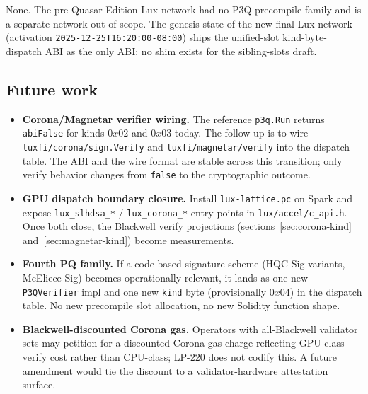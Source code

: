 None. The pre-Quasar Edition Lux network had no P3Q precompile
family and is a separate network out of scope. The genesis state
of the new final Lux network (activation
\texttt{2025-12-25T16:20:00-08:00}) ships the unified-slot
kind-byte-dispatch ABI as the only ABI; no shim exists for the
sibling-slots draft.

\subsection{Future work}

\begin{itemize}[leftmargin=2em,nosep]
\item \textbf{Corona/Magnetar verifier wiring.} The reference
  \texttt{p3q.Run} returns \texttt{abiFalse} for kinds $0x02$
  and $0x03$ today. The follow-up is to wire
  \texttt{luxfi/corona/sign.Verify} and
  \texttt{luxfi/magnetar/verify} into the dispatch table. The
  ABI and the wire format are stable across this transition;
  only verify behavior changes from \texttt{false} to the
  cryptographic outcome.
\item \textbf{GPU dispatch boundary closure.} Install
  \texttt{lux-lattice.pc} on Spark and expose
  \texttt{lux\_slhdsa\_*} / \texttt{lux\_corona\_*} entry
  points in \texttt{lux/accel/c\_api.h}. Once both close, the
  Blackwell verify projections (sections~\ref{sec:corona-kind}
  and~\ref{sec:magnetar-kind}) become measurements.
\item \textbf{Fourth PQ family.} If a code-based signature
  scheme (HQC-Sig variants, McEliece-Sig) becomes
  operationally relevant, it lands as one new
  \texttt{P3QVerifier} impl and one new \texttt{kind} byte
  (provisionally $0x04$) in the dispatch table. No new
  precompile slot allocation, no new Solidity function shape.
\item \textbf{Blackwell-discounted Corona gas.} Operators with
  all-Blackwell validator sets may petition for a discounted
  Corona gas charge reflecting GPU-class verify cost rather
  than CPU-class; LP-220 does not codify this. A future
  amendment would tie the discount to a validator-hardware
  attestation surface.
\end{itemize}
